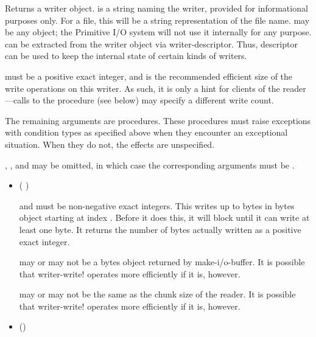 \begin{entry}{%
}
   
Returns a writer object.  is a string naming the writer,
provided for informational purposes only. For a file, this will be a
string representation of the file name.  may be any
object; the Primitive I/O system will not use it internally for any
purpose.  can be extracted from the writer object via
{\cf writer-descriptor}. Thus, descriptor can be used to keep the
internal state of certain kinds of writers.

 must be a positive exact integer, and is the
recommended efficient size of the write operations on this writer. As
such, it is only a hint for clients of the reader---calls to the
 procedure (see below) may specify a different write
count.

The remaining arguments are procedures. These procedures must raise
exceptions with condition types as specified above when they encounter
an exceptional situation. When they do not, the effects are
unspecified.

, , and  may be
omitted, in which case the corresponding arguments must be \schfalse.

\begin{itemize}
\item {\cf (   )}
   
   and  must be non-negative exact integers.
  This writes up to  bytes in bytes object 
  starting at index . Before it does this, it will block
  until it can write at least one byte. It returns the number of bytes
  actually written as a positive exact integer.
  
   may or may not be a bytes object returned by {\cf
    make-i/o-buffer}. It is possible that {\cf writer-write!} operates more
  efficiently if it is, however.
  
   may or may not be the same as the chunk size of the
  reader. It is possible that {\cf writer-write!} operates more
  efficiently if it is, however.

\item {\cf ()}
   

\end{itemize}
\end{entry}
